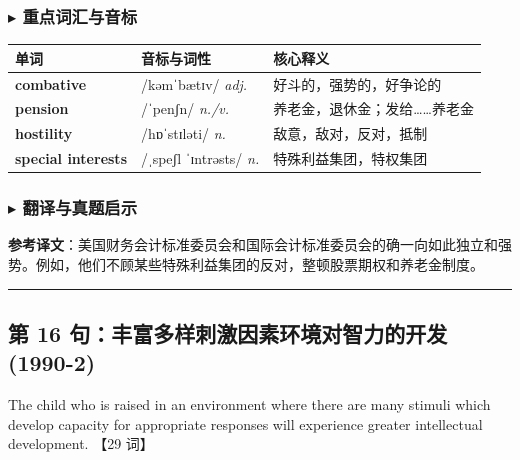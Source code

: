 \documentclass[cn,normal,11pt]{elegantnote}
\newcommand{\retrokey}[1]{{\color{accentcolor}\textbf{#1}}}
\renewcommand{\citshape}{\kaishu\fontspec{Arial}}
\begin{document}
\subsubsection*{$\blacktriangleright$ 重点词汇与音标}
\noindent
\begin{tabularx}{\textwidth}{l X p{7cm}}
  \toprule
  \textbf{单词} & \textbf{音标与词性} & \textbf{核心释义} \\
  \midrule
  \retrokey{combative} & {\citshape /kəmˈbætɪv/} \textit{adj.} & 好斗的，强势的，好争论的 \\
  \midrule
  \retrokey{pension} & {\citshape /ˈpenʃn/} \textit{n./v.} & 养老金，退休金；发给……养老金 \\
  \midrule
  \retrokey{hostility} & {\citshape /hɒˈstɪləti/} \textit{n.} & 敌意，敌对，反对，抵制 \\
  \midrule
  \retrokey{special interests} & {\citshape /ˌspeʃl ˈɪntrəsts/} \textit{n.} & 特殊利益集团，特权集团 \\
  \bottomrule
\end{tabularx}

\subsubsection*{$\blacktriangleright$ 翻译与真题启示}
\begin{remark}
  \textbf{参考译文}：美国财务会计标准委员会和国际会计标准委员会的确一向如此独立和强势。例如，他们不顾某些特殊利益集团的反对，整顿股票期权和养老金制度。
\end{remark}

\par\vspace{10pt}\hrule\vspace{10pt}

\subsection{第 16 句：丰富多样刺激因素环境对智力的开发 (1990-2)}

\begin{note}
  The child who is raised in an environment where there are many stimuli which develop capacity for appropriate responses will experience greater intellectual development. 【29 词】
\end{note}
\end{document}
